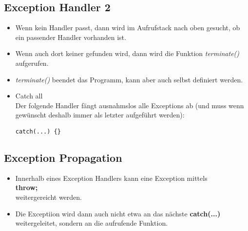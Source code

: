 \subsection{Exception Handler 2}
\begin{itemize}
	\item Wenn kein Handler passt, dann wird im Aufrufstack nach oben gesucht, ob ein passender Handler vorhanden ist.
	\item Wenn auch dort keiner gefunden wird, dann wird die Funktion \emph{terminate()} aufgerufen.
	\item \emph{terminate()} beendet das Programm, kann aber auch selbst definiert werden.
	\item Catch all\\
	Der folgende Handler fängt ausnahmslos alle Exceptions ab (und muss wenn gewünscht deshalb immer als letzter aufgeführt werden):\hspace{0.05\linewidth}
	\begin{minipage}{0.15\linewidth}
	\vspace{-\baselineskip}
\begin{lstlisting}
catch(...) {}
\end{lstlisting}
	\end{minipage}
\end{itemize}

\subsection{Exception Propagation}
\begin{itemize}
	\item Innerhalb eines Exception Handlers kann eine Exception mittels\\
	\textbf{throw;}\\
	weitergereicht werden.
	\item Die Exceptiion wird dann auch nicht etwa an das nächste \textbf{catch(...)} weitergeleitet, sondern an die aufrufende Funktion.
\end{itemize}

